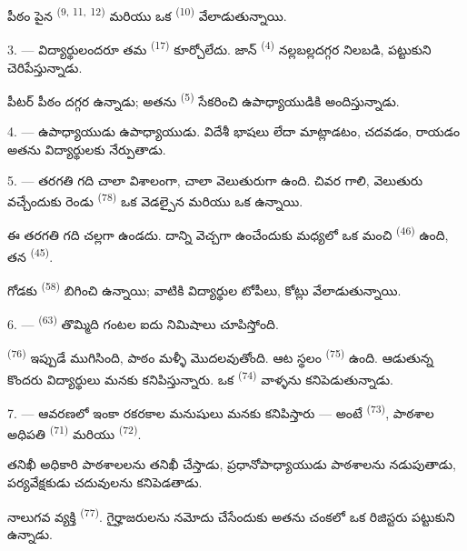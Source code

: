 పీఠం పైన  \textsuperscript{(9, 11,} \textsuperscript{12)} మరియు ఒక
 \textsuperscript{(10)} వేలాడుతున్నాయి.

3. --- విద్యార్థులందరూ తమ  \textsuperscript{(17)} కూర్చోలేదు. జాన్
\textsuperscript{(4)} నల్లబల్లదగ్గర నిలబడి,  పట్టుకుని
 చెరిపేస్తున్నాడు.

పీటర్ పీఠం దగ్గర ఉన్నాడు; అతను  \textsuperscript{(5)} సేకరించి
ఉపాధ్యాయుడికి అందిస్తున్నాడు.

4. ---  ఉపాధ్యాయుడు  ఉపాధ్యాయుడు. విదేశీ భాషలు
 లేదా  మాట్లాడటం,
చదవడం, రాయడం అతను విద్యార్థులకు నేర్పుతాడు.

5. --- తరగతి గది చాలా విశాలంగా, చాలా వెలుతురుగా ఉంది. చివర గాలి, వెలుతురు వచ్చేందుకు రెండు
 \textsuperscript{(78)} ఒక వెడల్పైన  మరియు ఒక
 ఉన్నాయి.

ఈ తరగతి గది చల్లగా ఉండదు. దాన్ని వెచ్చగా ఉంచేందుకు మధ్యలో ఒక మంచి 
\textsuperscript{(46)} ఉంది, తన  \textsuperscript{(45)}.

గోడకు  \textsuperscript{(58)} బిగించి ఉన్నాయి; వాటికి విద్యార్థుల
టోపీలు, కోట్లు వేలాడుతున్నాయి.

\VUsaut{5.2mm}
\VUsaut{3.6mm}

6. ---  \textsuperscript{(63)} తొమ్మిది గంటల ఐదు నిమిషాలు చూపిస్తోంది.

 \textsuperscript{(76)} ఇప్పుడే ముగిసింది, పాఠం మళ్ళీ మొదలవుతోంది. ఆట స్థలం  \textsuperscript{(75)} ఉంది. ఆడుతున్న కొందరు విద్యార్థులు మనకు కనిపిస్తున్నారు. ఒక  \textsuperscript{(74)} వాళ్ళను కనిపెడుతున్నాడు.

7. --- ఆవరణలో ఇంకా రకరకాల మనుషులు మనకు కనిపిస్తారు — అంటే 
\textsuperscript{(73)}, పాఠశాల అధిపతి  \textsuperscript{(71)}
మరియు  \textsuperscript{(72)}.

తనిఖీ అధికారి పాఠశాలలను తనిఖీ చేస్తాడు, ప్రధానోపాధ్యాయుడు పాఠశాలను నడుపుతాడు, పర్యవేక్షకుడు
చదువులను కనిపెడతాడు.

నాలుగవ వ్యక్తి  \textsuperscript{(77)}. గైర్హాజరులను నమోదు చేసేందుకు అతను
చంకలో ఒక రిజిస్టరు పట్టుకుని ఉన్నాడు.

